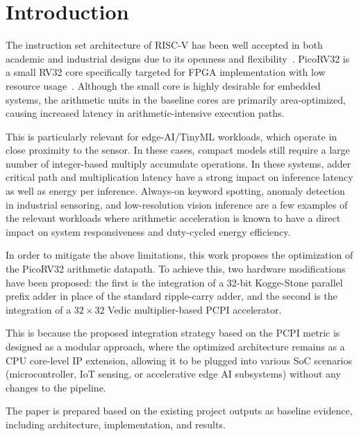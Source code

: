 \section{Introduction}
\label{sec:introduction}

The instruction set architecture of RISC-V has been well accepted in both academic and industrial designs due to its openness and flexibility~\cite{riscv_spec}. PicoRV32 is a small RV32 core specifically targeted for FPGA implementation with low resource usage~\cite{picorv32_yosys}. Although the small core is highly desirable for embedded systems, the arithmetic units in the baseline cores are primarily area-optimized, causing increased latency in arithmetic-intensive execution paths.

This is particularly relevant for edge-AI/TinyML workloads, which operate in close proximity to the sensor. In these cases, compact models still require a large number of integer-based multiply accumulate operations. In these systems, adder critical path and multiplication latency have a strong impact on inference latency as well as energy per inference. Always-on keyword spotting, anomaly detection in industrial sensoring, and low-resolution vision inference are a few examples of the relevant workloads where arithmetic acceleration is known to have a direct impact on system responsiveness and duty-cycled energy efficiency.

In order to mitigate the above limitations, this work proposes the optimization of the PicoRV32 arithmetic datapath. To achieve this, two hardware modifications have been proposed: the first is the integration of a 32-bit Kogge-Stone parallel prefix adder in place of the standard ripple-carry adder, and the second is the integration of a $32\times32$ Vedic multiplier-based PCPI accelerator.

This is because the proposed integration strategy based on the PCPI metric is designed as a modular approach, where the optimized architecture remains as a CPU core-level IP extension, allowing it to be plugged into various SoC scenarios (microcontroller, IoT sensing, or accelerative edge AI subsystems) without any changes to the pipeline.

The paper is prepared based on the existing project outputs as baseline evidence, including architecture, implementation, and results.

